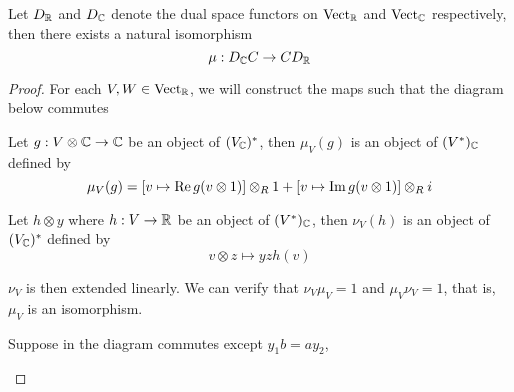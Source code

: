 \begin{proposition}
	Let $D_\R$ and $D_\C$ denote the dual space functors on $\Vect_\R$ and $\Vect_\C$ respectively, then there exists a natural isomorphism 
	$$
	\mu:  D_\C C \to C D_\R
	$$
	\begin{proof}
		For each $V, W \in \Vect_\R$, we will construct the maps such that the diagram below commutes
		\begin{center}
		\end{center}
		
		Let $g: V \otimes \C \to \C$ be an object of $(V_\C)^*$, then $\mu_V(g)$ is an object of $(V^*)_\C$ defined by
		$$
		\mu_V(g) = \bracket*{v \mapsto \real g(v \otimes 1)} \otimes_R 1 + \bracket*{v \mapsto \imag g(v \otimes 1)} \otimes_R i
		$$
		
		Let $h \otimes y$ where $h: V \to \R$ be an object of $(V^*)_\C$, then $\nu_V(h)$ is an object of $(V_\C)^*$ defined by
		$$
		v \otimes z \mapsto yz h(v)
		$$
		
		$\nu_V$ is then extended linearly. We can verify that $\nu_V \mu_V = 1$ and $\mu_V \nu_V = 1$, that is, $\mu_V$ is an isomorphism.
		
		Suppose in the diagram commutes except $y_1 b = a y_2$, 
		\begin{center}
		\end{center}
		

\end{proof}
\end{proposition}
